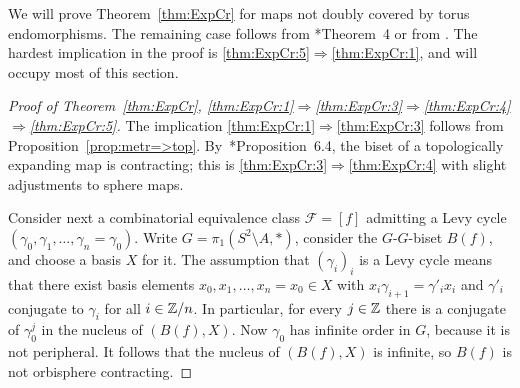 \documentclass{amsart}
\begin{document}
We will prove Theorem~\ref{thm:ExpCr} for maps not doubly covered by
torus endomorphisms. The remaining case follows from
\cite{haissinsky-pilgrim:algebraic}*{Theorem~4} or from
\cite{selinger-yampolsky:geometrization}.  The hardest implication in
the proof is \eqref{thm:ExpCr:5}$\Rightarrow$\eqref{thm:ExpCr:1}, and
will occupy most of this section.
\begin{proof}[Proof of Theorem~\ref{thm:ExpCr}, \eqref{thm:ExpCr:1}$\Rightarrow$\eqref{thm:ExpCr:3}$\Rightarrow$\eqref{thm:ExpCr:4}$\Rightarrow$\eqref{thm:ExpCr:5}]\label{sec:ProofthmExpCr}
  The implication \eqref{thm:ExpCr:1}$\Rightarrow$\eqref{thm:ExpCr:3}
  follows from Proposition~\ref{prop:metr=>top}.
  By~\cite{bartholdi-h-n:aglt}*{Proposition~6.4}, the biset of a
  topologically expanding map is contracting; this is  \eqref{thm:ExpCr:3}$\Rightarrow$\eqref{thm:ExpCr:4} with slight adjustments to sphere maps.

  Consider next a combinatorial equivalence class $\mathscr F=[f]$
  admitting a Levy cycle
  $(\gamma_0,\gamma_1,\dots,\gamma_n=\gamma_0)$. Write
  $G=\pi_1(S^2\setminus A,*)$, consider the $G$-$G$-biset $B(f)$, and
  choose a basis $X$ for it. The assumption that $(\gamma_i)_i$ is a
  Levy cycle means that there exist basis elements
  $x_0,x_1,\dots,x_n=x_0\in X$ with $x_i\gamma_{i+1}=\gamma'_i x_i$
  and $\gamma'_i$ conjugate to $\gamma_i$ for all $i\in{\mathbb Z}/n$. In
  particular, for every $j\in{\mathbb Z}$ there is a conjugate of $\gamma_0^j$
  in the nucleus of $(B(f),X)$. Now $\gamma_0$ has infinite order in
  $G$, because it is not peripheral. It follows that the nucleus of
  $(B(f),X)$ is infinite, so $B(f)$ is not orbisphere contracting.
\end{proof}
\end{document}

